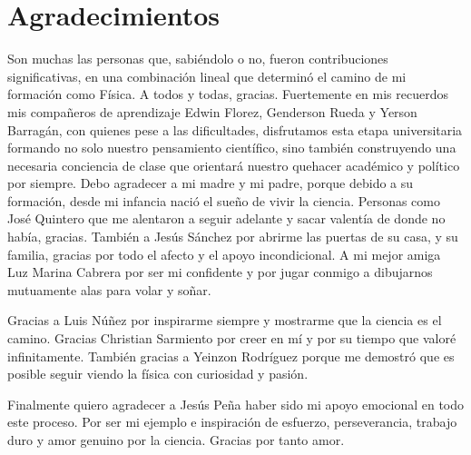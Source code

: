 \newpage
\chapter*{Agradecimientos}

Son muchas las personas que, sabiéndolo o no, fueron contribuciones significativas, en una combinación lineal que determinó el camino de mi formación como Física. A todos y todas, gracias. Fuertemente en mis recuerdos mis compañeros de aprendizaje Edwin Florez, Genderson Rueda y Yerson Barragán, con quienes pese a las dificultades, disfrutamos esta etapa universitaria formando no solo nuestro pensamiento científico, sino también construyendo una necesaria conciencia de clase que orientará nuestro quehacer académico y político por siempre. Debo agradecer a mi madre y mi padre, porque debido a su formación, desde mi infancia nació el sueño de vivir la ciencia. Personas como José Quintero que me alentaron a seguir adelante y sacar valentía de donde no había, gracias. También a Jesús Sánchez por abrirme las puertas de su casa, y su familia, gracias por todo el afecto y el apoyo incondicional. A mi mejor amiga Luz Marina Cabrera por ser mi confidente y por jugar conmigo a dibujarnos mutuamente alas para volar y soñar.

Gracias a Luis Núñez por inspirarme siempre y mostrarme que la ciencia es el camino. Gracias Christian Sarmiento por creer en mí y por su tiempo que valoré infinitamente. También gracias a Yeinzon Rodríguez porque me demostró que es posible seguir viendo la física con curiosidad y pasión.

Finalmente quiero agradecer a Jesús Peña haber sido mi apoyo emocional en todo este proceso. Por ser mi ejemplo e inspiración de esfuerzo, perseverancia, trabajo duro y amor genuino por la ciencia. Gracias por tanto amor.